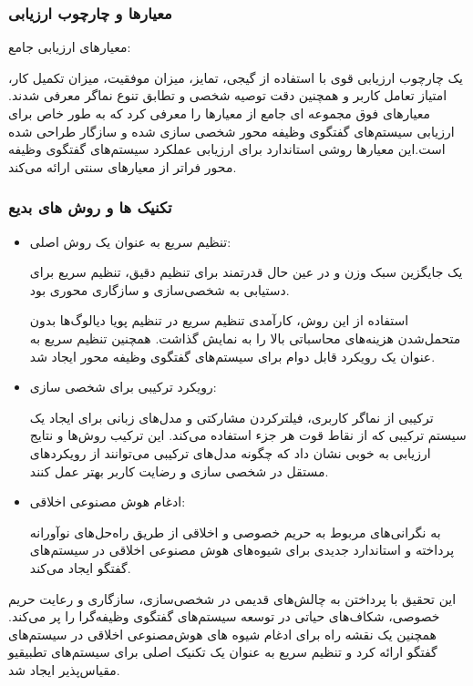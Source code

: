 \subsubsection{معیارها و چارچوب ارزیابی}
معیارهای ارزیابی جامع:

یک چارچوب ارزیابی قوی با استفاده از گیجی، تمایز، میزان موفقیت، میزان تکمیل کار، امتیاز تعامل کاربر و همچنین دقت توصیه شخصی و تطابق تنوع نماگر معرفی شدند.
معیارهای فوق مجموعه ای جامع از معیارها را معرفی کرد که به طور خاص برای ارزیابی سیستم‌های گفتگوی وظیفه محور شخصی سازی شده و سازگار طراحی شده است.این معیارها روشی استاندارد برای ارزیابی عملکرد سیستم‌های گفتگوی وظیفه محور فراتر از معیارهای سنتی ارائه می‌کند.


\subsubsection{تکنیک ها و روش های بدیع}


\begin{itemize}
\item
 تنظیم سریع به عنوان یک روش اصلی:

 یک جایگزین سبک وزن و در عین حال قدرتمند برای تنظیم دقیق، تنظیم سریع برای دستیابی به شخصی‌سازی و سازگاری محوری بود.
 
استفاده از این روش، کارآمدی تنظیم سریع در تنظیم پویا دیالوگ‌ها بدون متحمل‌شدن هزینه‌های محاسباتی بالا را به نمایش گذاشت. همچنین تنظیم سریع به عنوان یک رویکرد قابل دوام برای سیستم‌های گفتگوی وظیفه محور ایجاد شد.

\item
 رویکرد ترکیبی برای شخصی سازی:

 ترکیبی از نماگر کاربری، فیلترکردن مشارکتی و مدل‌های زبانی برای ایجاد یک سیستم ترکیبی که از نقاط قوت هر جزء استفاده می‌کند. این ترکیب روش‌ها و نتایج ارزیابی به خوبی نشان داد که چگونه مدل‌های ترکیبی می‌توانند از رویکردهای مستقل در شخصی سازی و رضایت کاربر بهتر عمل کنند.

\item
 ادغام هوش مصنوعی اخلاقی:

 به نگرانی‌های مربوط به حریم خصوصی و اخلاقی از طریق راه‌حل‌های نوآورانه پرداخته و استاندارد جدیدی برای شیوه‌های هوش مصنوعی اخلاقی در سیستم‌های گفتگو ایجاد می‌کند.
\end{itemize}


این تحقیق با پرداختن به چالش‌های قدیمی در شخصی‌سازی، سازگاری و رعایت حریم خصوصی، شکاف‌های حیاتی در توسعه سیستم‌های گفتگوی وظیفه‌گرا را پر می‌کند. همچنین یک نقشه راه برای ادغام شیوه های هوش‌مصنوعی اخلاقی در سیستم‌های گفتگو ارائه کرد و تنظیم سریع به عنوان یک تکنیک اصلی برای سیستم‌های تطبیقی ​​و مقیاس‌پذیر ایجاد شد.

